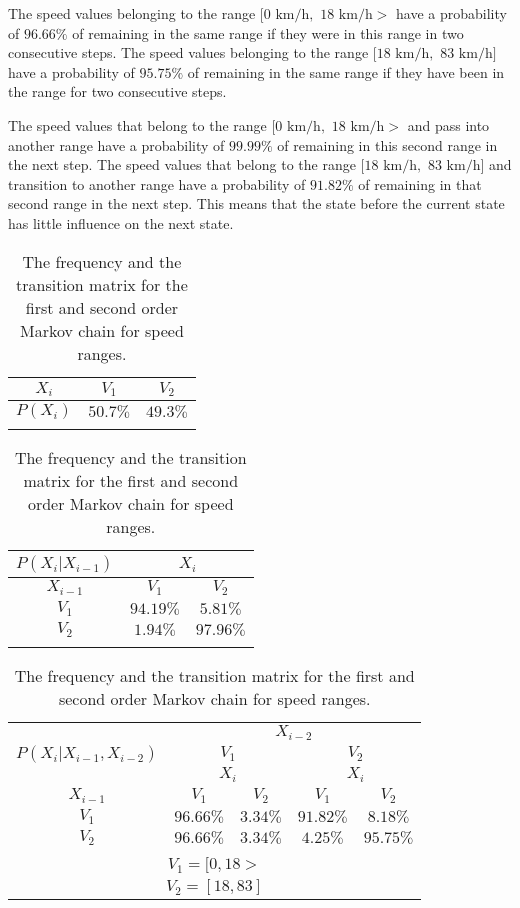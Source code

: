 \documentclass[preprint,12pt]{elsarticle}
\begin{document}
The speed values belonging to the range $[0$ $\mathrm{km/h},$ $18$ $\mathrm{km/h}>$ have a probability of $96.66\%$ of remaining in the same range if they were in this range in two consecutive steps. The speed values belonging to the range $[18$ $\mathrm{km/h},$ $83$ $\mathrm{km/h}]$ have a probability of $95.75\%$ of remaining in the same range if they have been in the range for two consecutive steps.

The speed values that belong to the range $[0$ $\mathrm{km/h},$ $18$ $\mathrm{km/h}>$ and pass into another range have a probability of $99.99\%$ of remaining in this second range in the next step. The speed values that belong to the range $[18$ $\mathrm{km/h},$ $83$ $\mathrm{km/h}]$ and transition to another range have a probability of $91.82\%$ of remaining in that second range in the next step. This means that the state before the current state has little influence on the next state.

\begin{table}[!ht]
\centering
\begin{tabular}{|c|c|c|}
\hline
$X_{i}$ & $V_{1}$ & $V_{2}$\\ \hline
$P(X_{i})$ & $50.7\%$ & $49.3\%$\\ \hline
\multicolumn{3}{c}{}\\
\end{tabular}

\begin{tabular}{|c|c|c|}
\hline
$P(X_{i}|X_{i-1})$ & \multicolumn{2}{|c|}{$X_{i}$}\\ \hline
$X_{i-1}$ & $V_{1}$ & $V_{2}$\\ \hline
$V_{1}$ & $94.19\%$ & $5.81\%$\\ \hline
$V_{2}$ & $1.94\%$ & $97.96\%$\\ \hline
\multicolumn{3}{c}{}\\
\end{tabular}

\begin{tabular}{|c|c|c|c|c|}
\hline
\multirow{3}{*}{$P(X_{i}|X_{i-1},X_{i-2})$} & \multicolumn{4}{|c|}{$X_{i-2}$}\\ \cline{2-5}
 & \multicolumn{2}{|c|}{$V_{1}$} & \multicolumn{2}{|c|}{$V_{2}$}\\ \cline{2-5}
 & \multicolumn{2}{|c|}{$X_{i}$} & \multicolumn{2}{|c|}{$X_{i}$}\\ \hline
$X_{i-1}$ & $V_{1}$ & $V_{2}$ & $V_{1}$ & $V_{2}$\\ \hline
$V_{1}$ & $96.66\%$ & $3.34\%$ & $91.82\%$ & $8.18\%$\\ \hline
$V_{2}$ & $96.66\%$ & $3.34\%$ & $4.25\%$ & $95.75\%$\\ \hline
\multicolumn{5}{c}{}\\
\multicolumn{5}{c}{$V_{1} = [0, 18>$}\\
\multicolumn{5}{c}{$V_{2} = [18, 83]$}\\
\end{tabular}
\caption{The frequency and the transition matrix for the first and second order Markov chain for speed ranges.}
\label{tab:speed}
\end{table}
\end{document}
